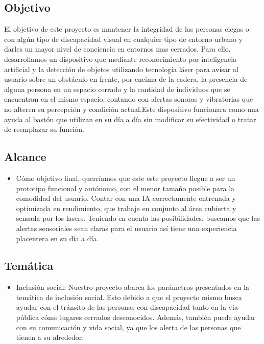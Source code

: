\documentclass[12pt,a4paper]{article}
\begin{document}
\subsection{Objetivo}
El objetivo de este proyecto es mantener la integridad de las personas ciegas o con algún tipo de discapacidad visual en cualquier tipo de entorno urbano y darles un mayor nivel de conciencia en entornos mas cerrados. Para ello, desarrollamos un dispositivo que mediante reconocimiento por inteligencia artificial y la detección de objetos utilizando tecnología láser para avisar al usuario sobre un obstáculo en frente, por encima de la cadera, la presencia de alguna persona en un espacio cerrado y la cantidad de individuos que se encuentran en el mismo espacio, contando con alertas sonoras y vibratorias que no alteren su percepción y condición actual.Este dispositivo funcionara como una ayuda al bastón que utilizan en su día a día sin modificar su efectividad o tratar de reemplazar su función.

\subsection{Alcance}
\begin{itemize}

\item Cómo objetivo final, querríamos que este este proyecto llegue a ser un prototipo funcional y autónomo, con el menor tamaño posible para la comodidad del usuario. Contar con una IA correctamente entrenada y optimizada en rendimiento, que trabaje en conjunto al área cubierta y sensada por los lasers. Teniendo en cuenta las posibilidades, buscamos que las alertas sensoriales sean claras para el usuario así tiene una experiencia placentera en su día a día.
\end{itemize}

\subsection{Temática}

 \begin{itemize}
 \item Inclusión social: Nuestro proyecto abarca los parámetros presentados en la temática de inclusión social. Esto debido a que el proyecto mismo busca ayudar con el tránsito de las personas con discapacidad tanto en la vía pública cómo lugares cerrados desconocidos. Además, también puede ayudar con su comunicación y vida social, ya que los alerta de las personas que tienen a su alrededor. 
 \end{itemize}
 
\end{document}
